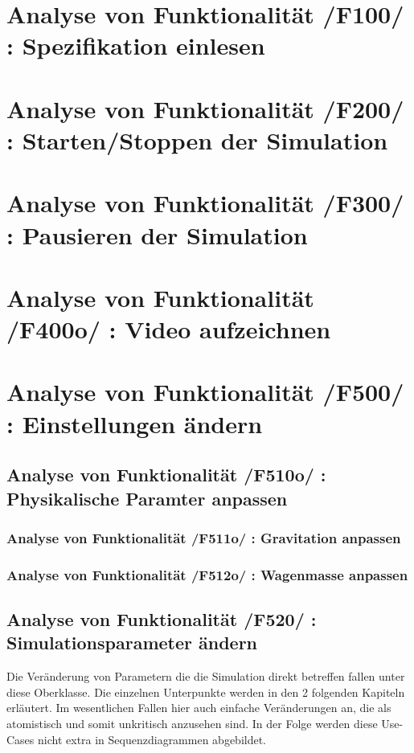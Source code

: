 \section{Analyse von Funktionalität /F100/ :  Spezifikation einlesen }
\section{Analyse von Funktionalität /F200/ :  Starten/Stoppen der Simulation}
\section{Analyse von Funktionalität /F300/ :  Pausieren der Simulation}
\section{Analyse von Funktionalität /F400o/ :  Video aufzeichnen}
\section{Analyse von Funktionalität /F500/ :  Einstellungen ändern}
\subsection{Analyse von Funktionalität /F510o/ :  Physikalische Paramter anpassen}
\subsubsection{Analyse von Funktionalität /F511o/ :  Gravitation anpassen}
\subsubsection{Analyse von Funktionalität /F512o/ :  Wagenmasse anpassen}
\subsection{Analyse von Funktionalität /F520/ :  Simulationsparameter ändern}
Die Veränderung von Parametern die die Simulation direkt betreffen fallen unter diese Oberklasse. Die einzelnen Unterpunkte werden in den 2 folgenden Kapiteln erläutert. Im wesentlichen Fallen hier 
auch einfache Veränderungen an, die als atomistisch und somit unkritisch anzusehen sind. In der Folge werden diese Use-Cases nicht extra in Sequenzdiagrammen abgebildet.
